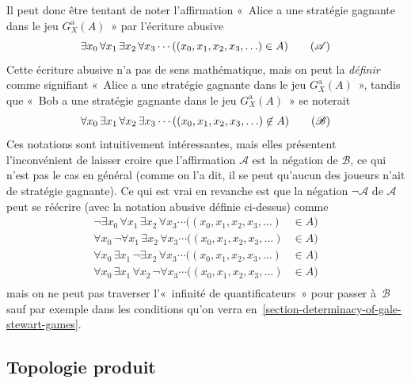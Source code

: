 \documentclass[12pt,a4paper]{article}
\theoremstyle{definition}
\begin{document}
Il peut donc être tentant de noter l'affirmation « Alice a une
  stratégie gagnante dans le jeu $G_X^{\mathrm{a}}(A)$ » par
l'écriture abusive
\[
\exists x_0\, \forall x_1\, \exists x_2\, \forall x_3\cdots
((x_0,x_1,x_2,x_3,\ldots) \in A)
\tag{$\mathscr{A}$}
\]
Cette écriture abusive n'a pas de sens mathématique, mais on peut la
\emph{définir} comme signifiant « Alice a une stratégie gagnante dans
  le jeu $G_X^{\mathrm{a}}(A)$ », tandis que « Bob a une stratégie
  gagnante dans le jeu $G_X^{\mathrm{a}}(A)$ » se noterait
\[
\forall x_0\, \exists x_1\, \forall x_2\, \exists x_3\cdots
((x_0,x_1,x_2,x_3,\ldots) \not\in A)
\tag{$\mathscr{B}$}
\]
Ces notations sont intuitivement intéressantes, mais elles présentent
l'inconvénient de laisser croire que l'affirmation $\mathscr{A}$ est
la négation de $\mathscr{B}$, ce qui n'est pas le cas en général
(comme on l'a dit, il se peut qu'aucun des joueurs n'ait de stratégie
gagnante).  Ce qui est vrai en revanche est que la négation
$\neg\mathscr{A}$ de $\mathscr{A}$ peut se réécrire (avec la notation
abusive définie ci-dessus) comme
\[
\begin{aligned}
\neg\exists x_0\, \forall x_1\, \exists x_2\, \forall x_3\cdots
((x_0,x_1,x_2,x_3,\ldots) &\in A)\\
\forall x_0\, \neg\forall x_1\, \exists x_2\, \forall x_3\cdots
((x_0,x_1,x_2,x_3,\ldots) &\in A)\\
\forall x_0\, \exists x_1\, \neg\exists x_2\, \forall x_3\cdots
((x_0,x_1,x_2,x_3,\ldots) &\in A)\\
\forall x_0\, \exists x_1\, \forall x_2\, \neg\forall x_3\cdots
((x_0,x_1,x_2,x_3,\ldots) &\in A)\\
\end{aligned}
\]
mais on ne peut pas traverser l'« infinité de quantificateurs » pour
passer à $\mathscr{B}$ sauf par exemple dans les conditions qu'on
verra en \ref{section-determinacy-of-gale-stewart-games}.


\subsection{Topologie produit}
\end{document}
